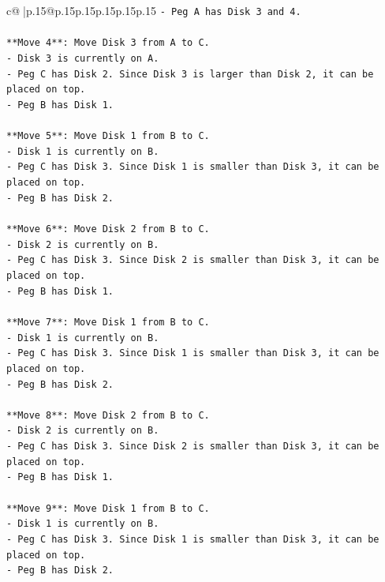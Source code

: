 \documentclass{article}
\begin{document}
{\begin{supertabular}{c@{$\;$}|p{.15\linewidth}@{}p{.15\linewidth}p{.15\linewidth}p{.15\linewidth}p{.15\linewidth}p{.15\linewidth}}
{{{\texttt{{-} Peg A has Disk 3 and 4.} \\
\\ 
\texttt{**Move 4**: Move Disk 3 from A to C.} \\
\texttt{{-} Disk 3 is currently on A.} \\
\texttt{{-} Peg C has Disk 2. Since Disk 3 is larger than Disk 2, it can be placed on top.} \\
\texttt{{-} Peg B has Disk 1.} \\
\\ 
\texttt{**Move 5**: Move Disk 1 from B to C.} \\
\texttt{{-} Disk 1 is currently on B.} \\
\texttt{{-} Peg C has Disk 3. Since Disk 1 is smaller than Disk 3, it can be placed on top.} \\
\texttt{{-} Peg B has Disk 2.} \\
\\ 
\texttt{**Move 6**: Move Disk 2 from B to C.} \\
\texttt{{-} Disk 2 is currently on B.} \\
\texttt{{-} Peg C has Disk 3. Since Disk 2 is smaller than Disk 3, it can be placed on top.} \\
\texttt{{-} Peg B has Disk 1.} \\
\\ 
\texttt{**Move 7**: Move Disk 1 from B to C.} \\
\texttt{{-} Disk 1 is currently on B.} \\
\texttt{{-} Peg C has Disk 3. Since Disk 1 is smaller than Disk 3, it can be placed on top.} \\
\texttt{{-} Peg B has Disk 2.} \\
\\ 
\texttt{**Move 8**: Move Disk 2 from B to C.} \\
\texttt{{-} Disk 2 is currently on B.} \\
\texttt{{-} Peg C has Disk 3. Since Disk 2 is smaller than Disk 3, it can be placed on top.} \\
\texttt{{-} Peg B has Disk 1.} \\
\\ 
\texttt{**Move 9**: Move Disk 1 from B to C.} \\
\texttt{{-} Disk 1 is currently on B.} \\
\texttt{{-} Peg C has Disk 3. Since Disk 1 is smaller than Disk 3, it can be placed on top.} \\
\texttt{{-} Peg B has Disk 2.} \\
}}}
\end{supertabular}}
\end{document}
